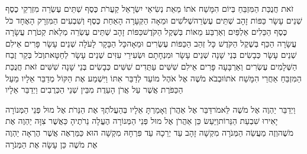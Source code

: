 \documentclass[../main/main.tex]{subfiles}
\begin{document}
\begin{multicols}{\ncols}
זֹאת חֲנֻכַּת הַמִּזְבֵּחַ בְּיוֹם הִמָּשַׁח אֹתוֹ מֵאֵת נְשִׂיאֵי יִשְׂרָאֵל קַעֲרֹת כֶּסֶף שְׁתֵּים עֶשְׂרֵה מִזְרְקֵי כֶסֶף שְׁנֵים עָשָׂר כַּפּוֹת זָהָב שְׁתֵּים עֶשְׂרֵה\PreVerseSpace{}שְׁלֹשִׁים וּמֵאָה הַקְּעָרָה הָאַחַת כֶּסֶף וְשִׁבְעִים הַמִּזְרָק הָאֶחָד כֹּל כֶּסֶף הַכֵּלִים אַלְפַּיִם וְאַרְבַּע מֵאוֹת בְּשֶׁקֶל הַקֹּדֶשׁ\PreVerseSpace{}כַּפּוֹת זָהָב שְׁתֵּים עֶשְׂרֵה מְלֵאֹת קְטֹרֶת עֲשָׂרָה עֲשָׂרָה הַכַּף בְּשֶׁקֶל הַקֹּדֶשׁ כָּל זְהַב הַכַּפּוֹת עֶשְׂרִים וּמֵאָה\PreVerseSpace{}כָּל הַבָּקָר לָעֹלָה שְׁנֵים עָשָׂר פָּרִים אֵילִם שְׁנֵים עָשָׂר כְּבָשִׂים בְּנֵי שָׁנָה שְׁנֵים עָשָׂר וּמִנְחָתָם וּשְׂעִירֵי עִזִּים שְׁנֵים עָשָׂר לְחַטָּאת\PreVerseSpace{}וְכֹל בְּקַר זֶבַח הַשְּׁלָמִים עֶשְׂרִים וְאַרְבָּעָה פָּרִים אֵילִם שִׁשִּׁים עַתֻּדִים שִׁשִּׁים כְּבָשִׂים בְּנֵי שָׁנָה שִׁשִּׁים זֹאת חֲנֻכַּת הַמִּזְבֵּחַ אַחֲרֵי הִמָּשַׁח אֹתוֹ\PreVerseSpace{}וּבְבֹא מֹשֶׁה אֶל אֹהֶל מוֹעֵד לְדַבֵּר אִתּוֹ וַיִּשְׁמַע אֶת הַקּוֹל מְדַבֵּר אֵלָיו מֵעַל הַכַּפֹּרֶת אֲשֶׁר עַל אֲרֹן הָעֵדֻת מִבֵּין שְׁנֵי הַכְּרֻבִים וַיְדַבֵּר אֵלָיו\OpenSection{}\par
{}וַיְדַבֵּר יַהְוֶה אֶל מֹשֶׁה לֵּאמֹר\PreVerseSpace{}דַּבֵּר אֶל אַהֲרֹן וְאָמַרְתָּ אֵלָיו בְּהַעֲלֹתְךָ אֶת הַנֵּרֹת אֶל מוּל פְּנֵי הַמְּנוֹרָה יָאִירוּ שִׁבְעַת הַנֵּרוֹת\PreVerseSpace{}וַיַּעַשׂ כֵּן אַהֲרֹן אֶל מוּל פְּנֵי הַמְּנוֹרָה הֶעֱלָה נֵרֹתֶיהָ כַּאֲשֶׁר צִוָּה יַהְוֶה אֶת מֹשֶׁה\PreVerseSpace{}וְזֶה מַעֲשֵׂה הַמְּנֹרָה מִקְשָׁה זָהָב עַד יְרֵכָהּ עַד פִּרְחָהּ מִקְשָׁה הוּא כַּמַּרְאֶה אֲשֶׁר הֶרְאָה יַהְוֶה אֶת מֹשֶׁה כֵּן עָשָׂה אֶת הַמְּנֹרָה\OpenSection{}\par

\end{multicols}
\end{document}
